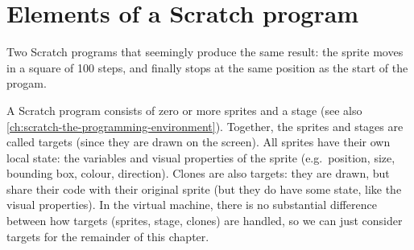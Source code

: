 \documentclass[../main]{subfiles}
\begin{document}
\section{Elements of a Scratch program}\label{sec:elements-of-a-scratch-program}

\begin{listing}
    \centering
    \begin{subfigure}{0.45\textwidth}
        \centering
        \begin{scratch}[scale=0.7]
        \end{scratch}
    \end{subfigure}
    \begin{subfigure}{0.45\textwidth}
        \centering
        \begin{scratch}[scale=0.7]
        \end{scratch}
    \end{subfigure}
    \caption{Two Scratch programs that seemingly produce the same result: the sprite moves in a square of 100 steps, and finally stops at the same position as the start of the progam.}
    \label{lst:scratch-two-programs}
\end{listing}

A Scratch program consists of zero or more sprites and a stage (see also \cref{ch:scratch-the-programming-environment}).
Together, the sprites and stages are called targets (since they are drawn on the screen).
All sprites have their own local state: the variables and visual properties of the sprite (e.g.\ position, size, bounding box, colour, direction).
Clones are also targets: they are drawn, but share their code with their original sprite (but they do have some state, like the visual properties).
In the virtual machine, there is no substantial difference between how targets (sprites, stage, clones) are handled, so we can just consider targets for the remainder of this chapter.
\end{document}
